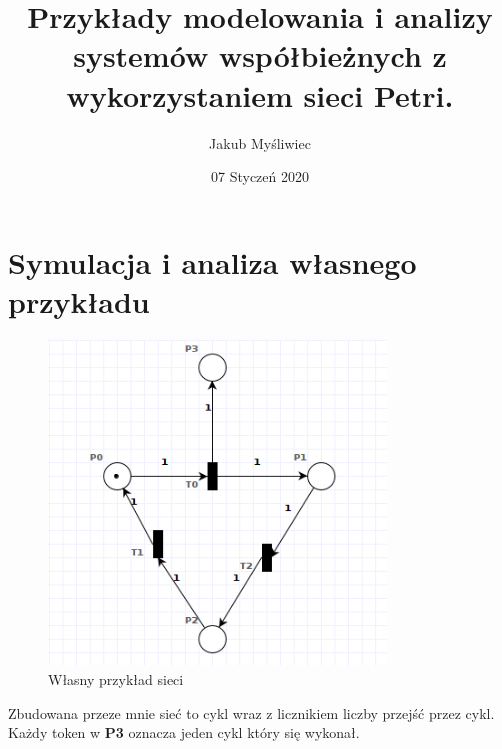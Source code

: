 \documentclass{article}
\title{Przykłady modelowania i analizy systemów
współbieżnych z wykorzystaniem sieci Petri.}
\author{Jakub Myśliwiec}
\date{07 Styczeń 2020}
\begin{document}
\maketitle


\section{Symulacja i analiza własnego przykładu}

\begin{figure}[H]
    \centering
    \includegraphics[width=0.8\textwidth, height=0.4\textheight]{zad1.png}
    \caption{Własny przykład sieci}
\end{figure}

Zbudowana przeze mnie sieć to cykl wraz z licznikiem liczby przejść przez cykl.
Każdy token w \textbf{P3} oznacza jeden cykl który się wykonał.
\end{document}
